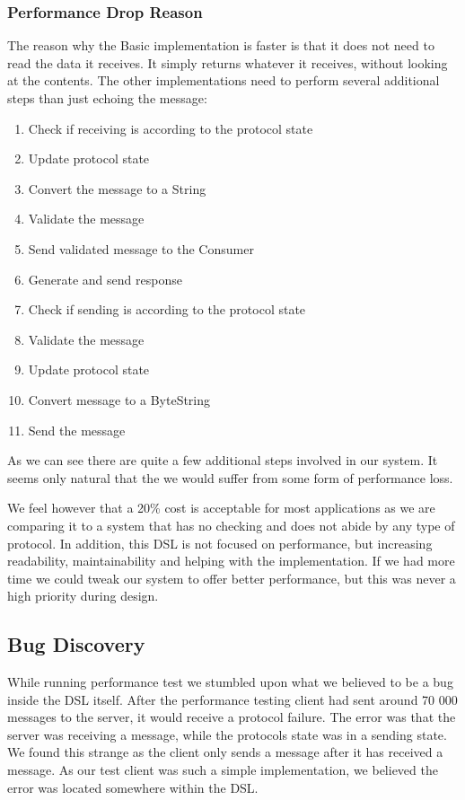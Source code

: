 \subsubsection{Performance Drop Reason}
The reason why the Basic implementation is faster is that it does not need to read the data it receives. It simply returns whatever it receives, without looking at the contents. The other implementations need to perform several additional steps than just echoing the message:
\begin{enumerate}
  \item Check if receiving is according to the protocol state
  \item Update protocol state
  \item Convert the message to a String
  \item Validate the message
  \item Send validated message to the Consumer
  \item Generate and send response
  \item Check if sending is according to the protocol state
  \item Validate the message
  \item Update protocol state
  \item Convert message to a ByteString
  \item Send the message
\end{enumerate}
As we can see there are quite a few additional steps involved in our system. It seems only natural that the we would suffer from some form of performance loss.

We feel however that a 20\% cost is acceptable for most applications as we are comparing it to a system that has no checking and does not abide by any type of protocol. In addition, this DSL is not focused on performance, but increasing readability, maintainability and helping with the implementation. If we had more time we could tweak our system to offer better performance, but this was never a high priority during design. 


\subsection{Bug Discovery}

While running performance test we stumbled upon what we believed to be a bug inside the DSL itself. After the performance testing client had sent around 70 000 messages to the server, it would receive a protocol failure. The error was that the server was receiving a message, while the protocols state was in a sending state. We found this strange as the client only sends a message after it has received a message. As our test client was such a simple implementation, we believed the error was located somewhere within the DSL.
 
